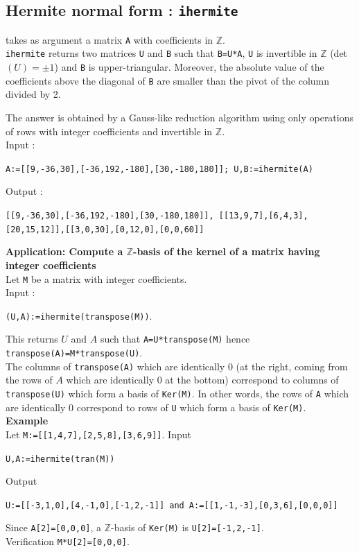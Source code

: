 \documentclass[a4paper,11pt]{book}
\begin{document}
\subsection{Hermite normal form : {\tt ihermite}}
 takes as argument a matrix {\tt A} with coefficients 
in $\mathbb Z$.\\
{\tt ihermite} returns two matrices {\tt U} and {\tt B} such that 
{\tt B=U*A}, {\tt U} is invertible in $\mathbb Z$ (det$(U) = \pm 1$)
and {\tt B} is upper-triangular. Moreover,
the absolute value of the coefficients above the diagonal of {\tt B}  are 
smaller than the pivot of the column divided by 2.

The answer is obtained by a Gauss-like reduction algorithm
using only operations of rows with integer coefficients
and invertible in $\mathbb Z$.\\
Input :
\begin{center}{\tt A:=[[9,-36,30],[-36,192,-180],[30,-180,180]]; U,B:=ihermite(A)}\end{center}
Output :
\begin{center}{\tt [[9,-36,30],[-36,192,-180],[30,-180,180]], [[13,9,7],[6,4,3],[20,15,12]],[[3,0,30],[0,12,0],[0,0,60]]}\end{center}

{\bf Application: Compute a $\mathbb Z$-basis of the kernel of a
matrix having integer coefficients}\\
Let {\tt M} be a matrix with integer coefficients.\\
Input :
\begin{center}
{\tt (U,A):=ihermite(transpose(M))}.
\end{center}
This returns $U$ and $A$ such that {\tt A=U*transpose(M)} hence \\
{\tt transpose(A)=M*transpose(U)}.\\
The columns of {\tt transpose(A)} which are identically 0 (at the right,
coming from the rows of $A$ which are identically 0 at the bottom)
correspond to columns of {\tt transpose(U)} which form a basis 
of {\tt Ker(M)}. In other words, the rows of {\tt A}
which are identically 0 correspond to rows of {\tt U} 
which form a basis of {\tt Ker(M)}.\\ 
{\bf Example}\\
Let {\tt  M:=[[1,4,7],[2,5,8],[3,6,9]]}. Input 
\begin{center}{\tt  U,A:=ihermite(tran(M))}\end{center}
Output
\begin{center}
{\tt  U:=[[-3,1,0],[4,-1,0],[-1,2,-1]] and A:=[[1,-1,-3],[0,3,6],[0,0,0]]}
\end{center}
Since {\tt A[2]=[0,0,0]}, a $\mathbb Z$-basis of {\tt Ker(M)} is
{\tt U[2]=[-1,2,-1]}.\\
Verification {\tt  M*U[2]=[0,0,0]}.
\end{document}
